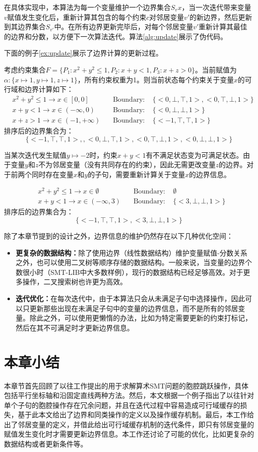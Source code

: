 在具体实现中，本算法为每一个变量维护一个边界集合$S_vx$，当一次迭代带来变量$v$赋值发生变化后，重新计算其包含的每个约束$c$对邻居变量$v'$的新边界，然后更新到其边界集合$S_{v'}$中。在所有边界更新完毕后，对每个邻居变量$v'$重新计算其最佳的边界和分数，以方便下一次算法迭代。算法\ref{alg:update}展示了伪代码。

下面的例子\ref{ex:update}展示了边界计算的更新过程。

\begin{example}
\label{ex:update}
考虑约束集合$F = \{P_1: x^2 + y^2 \leq 1, P_2: x + y < 1, P_3: x + z > 0\}$。当前赋值为$\alpha: \{x \mapsto 1, y \mapsto 1, z \mapsto 1\}$，所有约束权重为1。则当前状态每个约束关于变量$x$的可行域和边界计算如下：
\begin{align}
& x^2 + y^2 \leq 1  \rightarrow x \in [0, 0] \nonumber & \quad \text{Boundary: } & \{<0, \bot, \top, 1>, <0, \top, \bot, 1>\} \nonumber \\
& x + y < 1  \rightarrow x \in (-\infty, 0) \nonumber & \quad \text{Boundary: } & \{<0, \bot, \bot, 1>\} \nonumber \\
& x + z > 1  \rightarrow x \in (-1, +\infty) \nonumber & \quad \text{Boundary: } & \{<-1, \top, \top, 1>\} \nonumber
\end{align}
排序后的边界集合为：
$$
\{<-1, \top, \top, 1>, , <0, \bot, \top, 1>, <0, \top, \bot, 1>, <0, \bot, \bot, 1>\}
$$

当某次迭代发生赋值$y \mapsto -2$时，约束$x + y < 1$有不满足状态变为可满足状态。由于变量$y$和$z$不为邻居变量（没有共同存在的约束），因此无需更改变量$z$的边界。对于前两个同时存在变量$x$和$y$的子句，需要重新计算关于变量$x$的边界信息。

\begin{align}
& x^2 + y^2 \leq 1  \rightarrow x \in \emptyset \nonumber & \quad \text{Boundary: } & \emptyset \nonumber \\
& x + y < 1  \rightarrow x \in (-\infty, 3) \nonumber & \quad \text{Boundary: } & \{<3, \bot, \bot, 1>\} \nonumber
\end{align}
排序后的边界集合为：
$$
\{<-1, \top, \top, 1>, <3, \bot, \bot, 1>\}
$$
\end{example}

除了本章节提到的设计之外，边界信息的维护仍然存在以下几种优化空间：
\begin{itemize}
    \item \textbf{更复杂的数据结构：}除了使用边界（线性数据结构）维护变量赋值-分数关系之外，也可以使用二叉树等顺序存储的数据结构。一般来说，当变量的边界个数很小时（SMT-LIB中大多数样例），现行的数据结构已经足够高效。对于更多操作，二叉搜索树也许更为高效。
    \item \textbf{迭代优化：}在每次迭代中，由于本算法只会从未满足子句中选择操作，因此可以只更新那些出现在未满足子句中的变量的边界信息，而不是所有的邻居变量。除此之外，可以使用更懒惰的办法，比如为特定需要更新的约束打标记，然后在其不可满足时才更新边界信息。
\end{itemize}

\section{本章小结}
本章节首先回顾了以往工作提出的用于求解算术SMT问题的胞腔跳跃操作，具体包括平行坐标轴和沿固定直线两种方法。然后，本文根据一个例子指出了以往针对单个子句的胞腔操作存在冗余问题，并且在迭代过程中容易造成可行域缓存的损失，基于此本文给出了边界和同类操作的定义以及操作缓存机制。最后，本工作给出了邻居变量的定义，并借此给出可行域缓存机制的迭代条件，即只有邻居变量的赋值发生变化时才需要更新边界信息。本工作还讨论了可能的优化，比如更复杂的数据结构或者更新条件等。